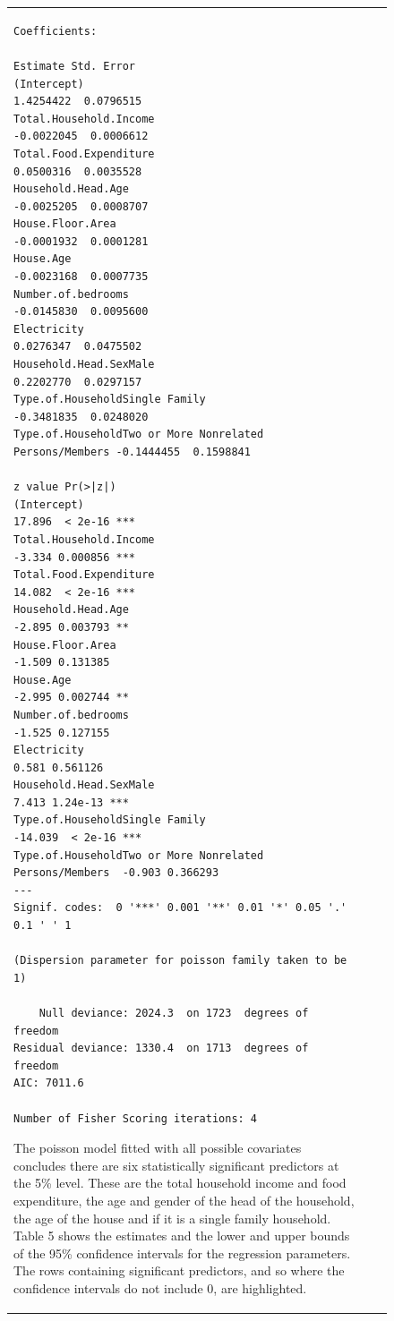 \documentclass[
]{article}
\begin{document}
\begin{figure}[H]
\begin{table}[H]
\begin{tabular}[t]{lrr}
\begin{verbatim}
Coefficients:
                                                          Estimate Std. Error
(Intercept)                                              1.4254422  0.0796515
Total.Household.Income                                  -0.0022045  0.0006612
Total.Food.Expenditure                                   0.0500316  0.0035528
Household.Head.Age                                      -0.0025205  0.0008707
House.Floor.Area                                        -0.0001932  0.0001281
House.Age                                               -0.0023168  0.0007735
Number.of.bedrooms                                      -0.0145830  0.0095600
Electricity                                              0.0276347  0.0475502
Household.Head.SexMale                                   0.2202770  0.0297157
Type.of.HouseholdSingle Family                          -0.3481835  0.0248020
Type.of.HouseholdTwo or More Nonrelated Persons/Members -0.1444455  0.1598841
                                                        z value Pr(>|z|)    
(Intercept)                                              17.896  < 2e-16 ***
Total.Household.Income                                   -3.334 0.000856 ***
Total.Food.Expenditure                                   14.082  < 2e-16 ***
Household.Head.Age                                       -2.895 0.003793 ** 
House.Floor.Area                                         -1.509 0.131385    
House.Age                                                -2.995 0.002744 ** 
Number.of.bedrooms                                       -1.525 0.127155    
Electricity                                               0.581 0.561126    
Household.Head.SexMale                                    7.413 1.24e-13 ***
Type.of.HouseholdSingle Family                          -14.039  < 2e-16 ***
Type.of.HouseholdTwo or More Nonrelated Persons/Members  -0.903 0.366293    
---
Signif. codes:  0 '***' 0.001 '**' 0.01 '*' 0.05 '.' 0.1 ' ' 1

(Dispersion parameter for poisson family taken to be 1)

    Null deviance: 2024.3  on 1723  degrees of freedom
Residual deviance: 1330.4  on 1713  degrees of freedom
AIC: 7011.6

Number of Fisher Scoring iterations: 4
\end{verbatim}

The poisson model fitted with all possible covariates concludes there
are six statistically significant predictors at the 5\% level. These are
the total household income and food expenditure, the age and gender of
the head of the household, the age of the house and if it is a single
family household. Table 5 shows the estimates and the lower and upper
bounds of the 95\% confidence intervals for the regression parameters.
The rows containing significant predictors, and so where the confidence
intervals do not include 0, are highlighted.


\end{tabular}
\end{table}
\end{figure}
\end{document}
